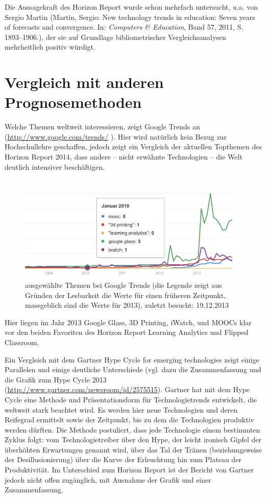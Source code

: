 \documentclass[a4paper,
fontsize=11pt,
oneside,
numbers=noperiodatend,
parskip=half-,
bibliography=totoc,
final
]{scrartcl}
\begin{document}
Die Aussagekraft des Horizon Report wurde schon mehrfach untersucht,
u.a. von Sergio Martin (Martin, Sergio: New technology trends in
education: Seven years of forecasts and convergence. In: \emph{Computers
\& Education}, Band 57, 2011, S. 1893--1906.), der sie auf Grundlage
bibliometrischer Vergleichsanalysen mehrheitlich positiv würdigt.

\section*{Vergleich mit anderen
Prognosemethoden}\label{vergleich-mit-anderen-prognosemethoden}

Welche Themen weltweit interessieren, zeigt Google Trends an
(\url{http://www.google.com/trends/} ). Hier wird natürlich kein Bezug
zur Hochschullehre geschaffen, jedoch zeigt ein Vergleich der aktuellen
Topthemen des Horizon Report 2014, dass andere -- nicht erwähnte
Technologien -- die Welt deutlich intensiver beschäftigen.

\begin{figure}[htbp]
\centering
\includegraphics{./img/03-Google_Trends.jpg}
\caption{ausgewählte Themen bei Google Trends (die Legende zeigt aus
Gründen der Lesbarkeit die Werte für einen früheren Zeitpunkt,
massgeblich sind die Werte für 2013), zuletzt besucht: 19.12.2013}
\end{figure}

Hier liegen im Jahr 2013 Google Glass, 3D Printing, iWatch, und MOOCs
klar vor den beiden Favoriten des Horizon Report Learning Analytics und
Flipped Classroom.~

Ein Vergleich mit dem Gartner Hype Cycle for emerging technologies zeigt
einige Parallelen und einige deutliche Unterschiede (vgl. dazu die
Zusammenfassung und die Grafik zum Hype Cycle 2013
(\url{http://www.gartner.com/newsroom/id/2575515}). Gartner hat mit dem
Hype Cycle eine Methode und Präsentationsform für Technologietrends
entwickelt, die weltweit stark beachtet wird. Es werden hier neue
Technologien und deren Reifegrad ermittelt sowie der Zeitpunkt, bis zu
dem die Technologien produktiv werden dürften. Die Methode postuliert,
dass jede Technologie einem bestimmten Zyklus folgt: vom
Technologietreiber über den Hype, der leicht ironisch Gipfel der
überhöhten Erwartungen genannt wird, über das Tal der Tränen
(beziehungsweise der Desillusionierung) über die Kurve der Erleuchtung
hin zum Plateau der Produktivität. Im Unterschied zum Horizon Report ist
der Bericht von Gartner jedoch nicht offen zugänglich, mit Ausnahme der
Grafik und einer Zusammenfassung.
\end{document}
